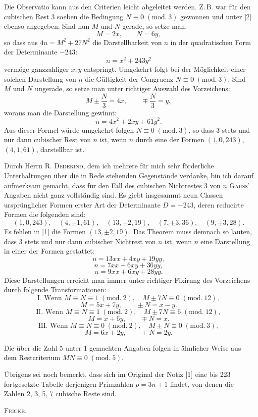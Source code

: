 
Die Observatio kann aus den Criterien leicht abgeleitet werden. Z.\,B. war für den cubischen Rest 3
soeben die Bedingung $N\equiv 0\;(\mathrm{mod.}\ 3)$ gewonnen und unter [2] ebenso angegeben. Sind nun $M$ und $N$
gerade, so setze man:
\[ M=2x,\qquad N=6y, \]
so dass aus $4n=M^2+27N^2$ die Darstellbarkeit von $n$ in der quadratischen Form der Determinante $-243$:
\[ n=x^2+243y^2 \]
vermöge ganzzahliger $x, y$ entspringt. Umgekehrt folgt bei der Möglichkeit einer solchen Darstellung von $n$
die Gültigkeit der Congruenz $N\equiv 0\;(\mathrm{mod.}\ 3)$. Sind $M$ und $N$ ungerade, so setze man unter richtiger Auswahl des Vorzeichens:
\[ M\pm\dfrac{N}{3}=4x,\qquad \mp\dfrac{N}{3}=y, \]
woraus man die Darstellung gewinnt:
\[ n=4x^2+2xy+61y^2. \]
Aus dieser Formel würde umgekehrt folgen $N\equiv 0\;(\mathrm{mod.}\ 3)$, so dass 3 stets und nur dann cubischer Rest
von $n$ ist, wenn $n$ durch eine der Formen $(1,0,243)$, $(4,1,61)$, darstellbar ist.

Durch Herrn R. \textsc{Dedekind}, dem ich mehrere für mich sehr förderliche Unterhaltungen über die in
Rede stehenden Gegenstände verdanke, bin ich darauf aufmerksam gemacht, dass für den Fall des cubischen
Nichtrestes 3 von $n$ \textsc{Gauss}' Angaben nicht ganz vollständig sind. Es giebt insgesammt neun Classen ursprünglicher Formen erster Art der Determinante $D=-243$, deren reducirte Formen die folgenden sind:
\[ (1,0,243),\quad (4,\pm1,61),\quad (13,\pm2,19),\quad (7,\pm3,36),\quad (9,\pm3,28). \]
Es fehlen in [1] die Formen $(13,\pm2,19)$. Das Theorem muss demnach so lauten, dass 3 stets und nur
dann cubischer Nichtrest von $n$ ist, wenn $n$ eine Darstellung in einer der Formen gestattet:
\[ n=13xx+4xy+19yy, \]
\[ n=7xx+6xy+36yy, \]
\[ n=9xx+6xy+28yy. \]
Diese Darstellungen erreicht man immer unter richtiger Fixirung des Vorzeichens durch folgende Transformationen:
\[ \text{I. Wenn } M\equiv N\equiv 1\;(\mathrm{mod.}\ 2),\quad M\pm 7N\equiv 0\;(\mathrm{mod.}\ 12), \]
\[ M=5x+7y,\qquad \pm N=x-y. \]
\[ \text{II. Wenn } M\equiv N\equiv 1\;(\mathrm{mod.}\ 2),\quad M\pm 7N\equiv 6\;(\mathrm{mod.}\ 12), \]
\[ M=x+6y,\qquad \mp N=x. \]
\[ \text{III. Wenn } M\equiv N\equiv 0\;(\mathrm{mod.}\ 2),\quad M\pm N\equiv 0\;(\mathrm{mod.}\ 3), \]
\[ M=6x+2y,\qquad \mp N=2y. \]
\par\noindent\hspace*{\parindent}Die über die Zahl 5 unter 1 gemachten Angaben folgen in ähnlicher Weise aus dem Restcriterium
$MN\equiv 0\;(\mathrm{mod.}\ 5)$.

Übrigens sei noch bemerkt, dass sich im Original der Notiz [1] eine bis 223 fortgesetzte Tabelle derjenigen Primzahlen $p=3n+1$ findet, von denen die Zahlen 2, 3, 5, 7 cubische Reste sind.

\hfill \textsc{Fricke.}

\endgroup
